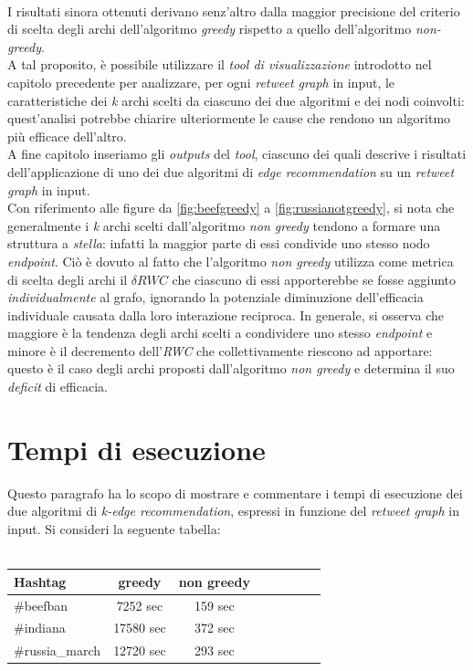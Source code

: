 \\I risultati sinora ottenuti derivano senz'altro dalla maggior precisione del criterio di scelta degli archi dell'algoritmo \textit{greedy} rispetto a quello dell'algoritmo \textit{non-greedy}. 
\\A tal proposito, è possibile utilizzare il \textit{tool di visualizzazione} introdotto nel capitolo precedente per analizzare, per ogni \textit{retweet graph} in input, le caratteristiche dei \textit{k} archi scelti da ciascuno dei due algoritmi e dei nodi coinvolti: quest'analisi potrebbe chiarire ulteriormente le cause che rendono un algoritmo più efficace dell'altro. 
\\A fine capitolo inseriamo gli \textit{outputs} del \textit{tool}, ciascuno dei quali descrive i risultati dell'applicazione di uno dei due algoritmi di \textit{edge recommendation} su un \textit{retweet graph} in input.
\\
Con riferimento alle figure da \ref{fig:beefgreedy} a \ref{fig:russianotgreedy}, si nota che generalmente i \textit{k} archi scelti dall'algoritmo \textit{non greedy} tendono a formare una struttura a \textit{stella}: infatti la maggior parte di essi condivide uno stesso nodo \textit{endpoint}. Ciò è dovuto al fatto che l'algoritmo \textit{non greedy} utilizza come metrica di scelta degli archi il \textit{$\delta RWC$} che ciascuno di essi apporterebbe se fosse aggiunto \textit{individualmente} al grafo, ignorando la potenziale diminuzione dell'efficacia individuale causata dalla loro interazione reciproca. In generale, si osserva che maggiore è la tendenza degli archi scelti a condividere uno stesso \textit{endpoint} e minore è il decremento dell'\textit{RWC} che collettivamente riescono ad apportare: questo è il caso degli archi proposti dall'algoritmo \textit{non greedy} e determina il suo \textit{deficit} di efficacia. 
\section{Tempi di esecuzione}
Questo paragrafo ha lo scopo di mostrare e commentare i tempi di esecuzione dei due algoritmi di \textit{k-edge recommendation}, espressi in funzione del \textit{retweet graph} in input. Si consideri la seguente tabella:
\\\\
\begin{tabular}{l*{6}{c}r}
\textbf{Hashtag}         & \textbf{greedy} & \textbf{non greedy}  \\
\hline
\#beefban 		 & 7252 sec & 159 sec  \\
\#indiana        	 & 17580 sec & 372 sec \\
\#russia\_march   	 & 12720 sec & 293 sec  \\
\end{tabular}
\\\\\\

